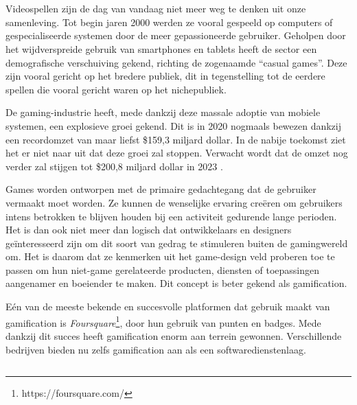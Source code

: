 
\chapter{}
\label{ch:inleiding}

Videospellen zijn de dag van vandaag niet meer weg te denken uit onze samenleving. Tot begin jaren 2000 werden ze vooral gespeeld op computers of gespecialiseerde systemen door de meer gepassioneerde gebruiker. Geholpen door het wijdverspreide gebruik van smartphones en tablets heeft de sector een demografische verschuiving gekend, richting de zogenaamde ``casual games''. Deze zijn vooral gericht op het bredere publiek, dit in tegenstelling tot de eerdere spellen die vooral gericht waren op het nichepubliek.

De gaming-industrie heeft, mede dankzij deze massale adoptie van mobiele systemen, een explosieve groei gekend. Dit is in 2020 nogmaals bewezen dankzij een recordomzet van maar liefst \$159,3 miljard dollar. In de nabije toekomst ziet het er niet naar uit dat deze groei zal stoppen. Verwacht wordt dat de omzet nog verder zal stijgen tot \$200,8 miljard dollar in 2023 \autocite{WePC2021}.

Games worden ontworpen met de primaire gedachtegang dat de gebruiker vermaakt moet worden. Ze kunnen de wenselijke ervaring creëren om gebruikers intens betrokken te blijven houden bij een activiteit gedurende lange perioden. Het is dan ook niet meer dan logisch dat ontwikkelaars en designers geïnteresseerd zijn om dit soort van gedrag te stimuleren buiten de gamingwereld om. Het is daarom dat ze kenmerken uit het game-design veld proberen toe te passen om hun niet-game gerelateerde producten, diensten of toepassingen aangenamer en boeiender te maken. Dit concept is beter gekend als gamification.

Eén van de meeste bekende en succesvolle platformen dat gebruik maakt van gamification is \textit{Foursquare}\footnote{https://foursquare.com/}, door hun gebruik van punten en badges. Mede dankzij dit succes heeft gamification enorm aan terrein gewonnen. Verschillende bedrijven bieden nu zelfs gamification aan als een softwaredienstenlaag.

\section{}
\label{sec:probleemstelling}

